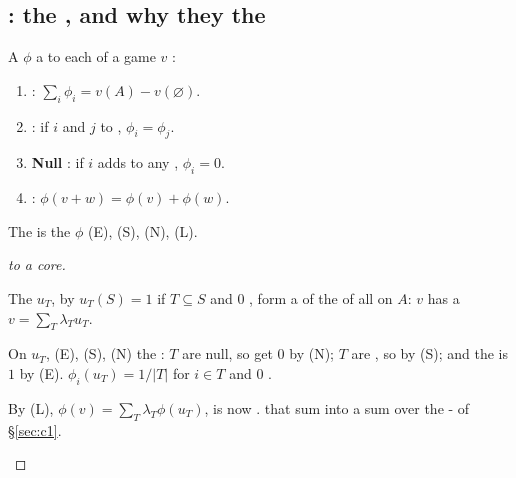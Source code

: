 \subsection{: the , and why they  the }

\begin{definition}[Axioms]
A  $\phi$  a  to each  of a  game $v$
:
\begin{enumerate}
\item[(E)] \textbf{}: $\sum_i \phi_i = v(A) - v(\varnothing)$.
\item[(S)] \textbf{}: if $i$ and $j$   to 
      , $\phi_i = \phi_j$.
\item[(N)] \textbf{Null }: if $i$ adds  to any ,
      $\phi_i = 0$.
\item[(L)] \textbf{}: $\phi(v+w) = \phi(v)+\phi(w)$.
\end{enumerate}
\end{definition}

\begin{theorem}
The   is the  $\phi$  (E), (S), (N), (L).
\end{theorem}
\begin{proof}
[ to a  core]
\begin{steps}
\item The \emph{ } $u_T$,  by $u_T(S)=1$ if
$T\subseteq S$ and $0$ , form a  of the   of all 
on $A$:  $v$ has a   $v=\sum_T \lambda_T u_T$.
\item On $u_T$,  (E), (S), (N)  the  : 
 $T$ are null, so get $0$ by (N);   $T$ are , so
  by (S); and the  is $1$ by (E). 
$\phi_i(u_T) = 1/|T|$ for $i \in T$ and $0$ .
\item By (L), $\phi(v) = \sum_T \lambda_T \phi(u_T)$,  is now
.  that sum into a sum over   the
-  of §\ref{sec:c1}.
\end{steps}
\end{proof}


